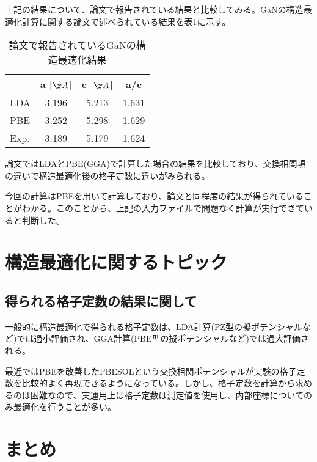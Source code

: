 上記の結果について、論文で報告されている結果と比較してみる。GaNの構造最適化計算に関する論文\cite{GaN_DFT_str}で述べられている結果を表\ref{gan_str-opt-ref}に示す。

\begin{table}[hbt]
  \caption{論文で報告されているGaNの構造最適化結果\cite{GaN_DFT_str}}
  \label{gan_str-opt-ref}
  \centering
  \begin{tabular}{lccc}
    \hline
     & a [$\AA$] & c [$\AA$] & a/c \\
     \hline \hline
     LDA & 3.196 & 5.213 & 1.631 \\
     PBE & 3.252 & 5.298 & 1.629\\
     Exp.\cite{GaN_DFT_str_2} & 3.189 & 5.179 & 1.624\\
     \hline
  \end{tabular}
\end{table}

論文ではLDAとPBE(GGA)で計算した場合の結果を比較しており、交換相関項の違いで構造最適化後の格子定数に違いがみられる。

今回の計算はPBEを用いて計算しており、論文と同程度の結果が得られていることがわかる。このことから、上記の入力ファイルで問題なく計算が実行できていると判断した。

\section{構造最適化に関するトピック}
\subsection{得られる格子定数の結果に関して}
一般的に構造最適化で得られる格子定数は、LDA計算(PZ型の擬ポテンシャルなど)では過小評価され、GGA計算(PBE型の擬ポテンシャルなど)では過大評価される。

最近ではPBEを改善したPBESOLという交換相関ポテンシャルが実験の格子定数を比較的よく再現できるようになっている。しかし、格子定数を計算から求めるのは困難なので、実運用上は格子定数は測定値を使用し、内部座標についてのみ最適化を行うことが多い。
\section{まとめ}
